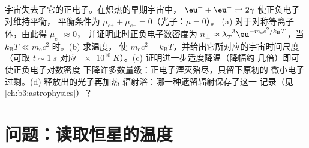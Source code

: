 \begin{exercise}[$\star\star\star$]\label{exo:b3:grand-canonical:12}
宇宙失去了它的正电子。在炽热的早期宇宙中，
$\eu^+ + \eu^- \rightleftharpoons 2\gamma$ 使正负电子对维持平衡，
平衡条件为 $\mu_{e^+} + \mu_{e^-} = 0$（光子：$\mu = 0$）。
(a) 对于对称等离子体，由此得 $\mu_{e^\pm} \approx 0$，
并证明此时正负电子数密度为 $n_\pm \approx
\lambda_T^{-3}\eu^{-m_{\text{e}}c^2/k_{\text{B}}T}$，当
$k_{\text{B}}T \ll m_{\text{e}}c^2$ 时。(b) 求温度，
使 $m_{\text{e}}c^2 = k_{\text{B}}T$，并给出它所对应的宇宙时间尺度
（可取 $t \sim \qty{1}{s}$ 对应
$\qty{e10}{K}$）。(c) 证明进一步适度降温（降幅约
几倍）即可使正负电子对数密度
下降许多数量级：正电子湮灭殆尽，只留下原初的
微小电子过剩。(d) 释放出的光子再加热
辐射浴：哪一种遗留辐射保存了这一
记录（见\cref{ch:b3:astrophysics}）？
\end{exercise}

\section{问题：读取恒星的温度}


